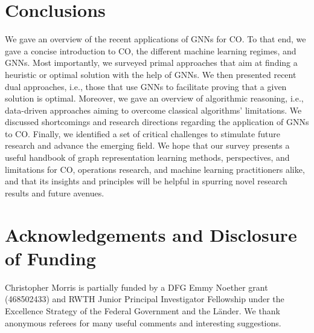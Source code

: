 \documentclass[twoside,11pt]{article}
\newcommand{\cm}[1]{{{\textcolor{orange}{\textbf{[CM:} {#1}\textbf{]}}}}}
\begin{document}
\section{Conclusions}
We gave an overview of the recent applications of GNNs for CO. To that end, we gave a concise introduction to CO, the different machine learning regimes, and GNNs. Most importantly, we surveyed primal approaches that aim at finding a heuristic or optimal solution with the help of GNNs. We then presented recent dual approaches, i.e., those that use GNNs to facilitate proving that a given solution is optimal. Moreover, we gave an overview of algorithmic reasoning, i.e., data-driven approaches aiming to overcome classical algorithms' limitations. We discussed shortcomings and research directions regarding the application of GNNs to CO. Finally, we identified a set of critical challenges to stimulate future research and advance the emerging field. We hope that our survey presents a useful handbook of graph representation learning methods, perspectives, and limitations for CO, operations research, and machine learning practitioners alike, and that its insights and principles will be helpful in spurring novel research results and future avenues.

\section*{Acknowledgements and Disclosure of Funding}
Christopher Morris is partially funded by a DFG Emmy Noether grant (468502433) and  RWTH Junior Principal Investigator Fellowship under the Excellence Strategy of the Federal Government and the Länder. We thank anonymous referees for many useful comments and interesting suggestions.

\appendix



\vskip 0.2in

\end{document}
